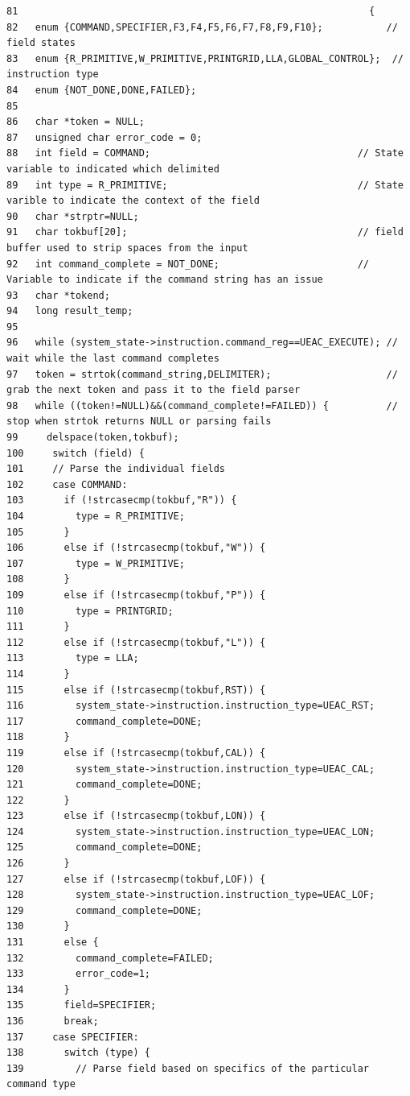 \footnotesize\begin{verbatim}81                                                             {
82   enum {COMMAND,SPECIFIER,F3,F4,F5,F6,F7,F8,F9,F10};           // field states
83   enum {R_PRIMITIVE,W_PRIMITIVE,PRINTGRID,LLA,GLOBAL_CONTROL};  // instruction type
84   enum {NOT_DONE,DONE,FAILED};
85 
86   char *token = NULL;
87   unsigned char error_code = 0;
88   int field = COMMAND;                                    // State variable to indicated which delimited 
89   int type = R_PRIMITIVE;                                 // State varible to indicate the context of the field
90   char *strptr=NULL;
91   char tokbuf[20];                                        // field buffer used to strip spaces from the input
92   int command_complete = NOT_DONE;                        // Variable to indicate if the command string has an issue 
93   char *tokend;
94   long result_temp;
95 
96   while (system_state->instruction.command_reg==UEAC_EXECUTE); // wait while the last command completes
97   token = strtok(command_string,DELIMITER);                    // grab the next token and pass it to the field parser  
98   while ((token!=NULL)&&(command_complete!=FAILED)) {          // stop when strtok returns NULL or parsing fails
99     delspace(token,tokbuf);
100     switch (field) {
101     // Parse the individual fields
102     case COMMAND:   
103       if (!strcasecmp(tokbuf,"R")) {
104         type = R_PRIMITIVE;
105       }
106       else if (!strcasecmp(tokbuf,"W")) {
107         type = W_PRIMITIVE;
108       }
109       else if (!strcasecmp(tokbuf,"P")) {
110         type = PRINTGRID;
111       }
112       else if (!strcasecmp(tokbuf,"L")) {
113         type = LLA;
114       }
115       else if (!strcasecmp(tokbuf,RST)) {
116         system_state->instruction.instruction_type=UEAC_RST;
117         command_complete=DONE;
118       }
119       else if (!strcasecmp(tokbuf,CAL)) {
120         system_state->instruction.instruction_type=UEAC_CAL;
121         command_complete=DONE;
122       }
123       else if (!strcasecmp(tokbuf,LON)) {
124         system_state->instruction.instruction_type=UEAC_LON;
125         command_complete=DONE;
126       }
127       else if (!strcasecmp(tokbuf,LOF)) {
128         system_state->instruction.instruction_type=UEAC_LOF;
129         command_complete=DONE;
130       }
131       else {
132         command_complete=FAILED;
133         error_code=1;
134       }
135       field=SPECIFIER;
136       break;
137     case SPECIFIER:
138       switch (type) {
139         // Parse field based on specifics of the particular command type

\end{verbatim}
